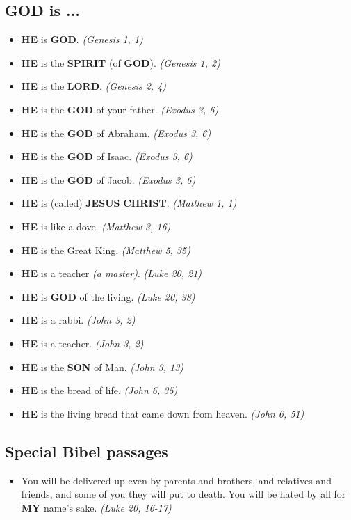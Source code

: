 \documentclass[10pt,a5paper]{article}
\newcommand{\Christ}[0]{\textbf{CHRIST}}
\newcommand{\God}[0]{\textbf{GOD}}
\newcommand{\He}[0]{\textbf{HE}}
\newcommand{\Jesus}[0]{\textbf{JESUS}}
\newcommand{\Lord}[0]{\textbf{LORD}}
\newcommand{\My}[0]{\textbf{MY}}
\newcommand{\Son}[0]{\textbf{SON}}
\newcommand{\Spirit}[0]{\textbf{SPIRIT}}
\begin{document}
	\subsection{{\God} is ...}
		\begin{itemize}[nosep]
			\item {\He} is {\God}. \textit{(Genesis 1, 1)}
			\item {\He} is the {\Spirit} (of {\God}). \textit{(Genesis 1, 2)}
			\item {\He} is the {\Lord}. \textit{(Genesis 2, 4)}
			\item {\He} is the {\God} of your father. \textit{(Exodus 3, 6)}
			\item {\He} is the {\God} of Abraham. \textit{(Exodus 3, 6)}
			\item {\He} is the {\God} of Isaac. \textit{(Exodus 3, 6)}
			\item {\He} is the {\God} of Jacob. \textit{(Exodus 3, 6)}
			\item {\He} is (called) {\Jesus} {\Christ}. \textit{(Matthew 1, 1)}
			\item {\He} is like a dove. \textit{(Matthew 3, 16)}
			\item {\He} is the Great King. \textit{(Matthew 5, 35)}
			\item {\He} is a teacher \textit{(a master)}. \textit{(Luke 20, 21)}
			\item {\He} is {\God} of the living. \textit{(Luke 20, 38)}		
			\item {\He} is a rabbi. \textit{(John 3, 2)}
			\item {\He} is a teacher. \textit{(John 3, 2)}
			\item {\He} is the {\Son} of Man. \textit{(John 3, 13)}
			\item {\He} is the bread of life. \textit{(John 6, 35)}
			\item {\He} is the living bread that came down from heaven. \textit{(John 6, 51)}
		\end{itemize}
	
	\subsection{Special Bibel passages}
		\begin{itemize}[nosep]
			\item	You will be delivered up even by parents and brothers,
					and relatives and friends,
					and some of you they will put to death.
					You will be hated by all for {\My} name's sake.
					\textit{(Luke 20, 16-17)}
		\end{itemize}
\end{document}
